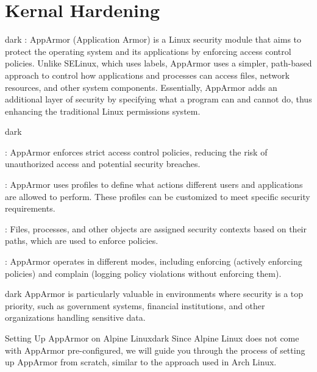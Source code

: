 \section{Kernal Hardening}
\label{Kernal Hardening}
\label{AppArmor}
\begin{baseBoxThree}{}{dark}
    \bigskip
    : AppArmor (Application Armor) is a Linux security module that aims to protect the operating system and its applications by enforcing access control policies.
    Unlike SELinux, which uses labels, AppArmor uses a simpler, path-based approach to control how applications and processes can access files, network resources, and other system components.
    Essentially, AppArmor adds an additional layer of security by specifying what a program can and cannot do, thus enhancing the traditional Linux permissions system.
    \bigskip
    \begin{baseBoxThree}{}{dark}
        \begin{posnexItemize}
            \item[\sA] : AppArmor enforces strict access control policies, reducing the risk of unauthorized access and potential security breaches.
            \item[\sA] : AppArmor uses profiles to define what actions different users and applications are allowed to perform. These profiles can be customized to meet specific security requirements.
            \item[\sA] : Files, processes, and other objects are assigned security contexts based on their paths, which are used to enforce policies.
            \item[\sA] : AppArmor operates in different modes, including enforcing (actively enforcing policies) and complain (logging policy violations without enforcing them).
        \end{posnexItemize}
        \smallskip
        \begin{baseBoxThree}{}{dark}
            \smallskip
            AppArmor is particularly valuable in environments where security is a top priority, such as government systems, financial institutions, and other organizations handling sensitive data.
            \smallskip
        \end{baseBoxThree}
        \smallskip
    \end{baseBoxThree}
    \smallskip
    \begin{baseBoxThree}{Setting Up AppArmor on Alpine Linux}{dark}
        \smallskip
        Since Alpine Linux does not come with AppArmor pre-configured, we will guide you through the process of setting up AppArmor from scratch, similar to the approach used in Arch Linux.
        \smallskip
    \end{baseBoxThree}
    \smallskip
\end{baseBoxThree}

